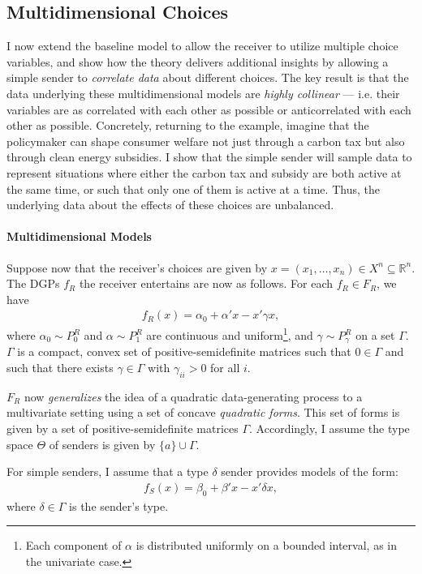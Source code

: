 \documentclass[11pt,dvipsnames]{article}
\begin{document}
\subsection{Multidimensional Choices}
I now extend the baseline model to allow the receiver to utilize multiple choice variables, and show how the theory delivers additional insights by allowing a simple sender to \emph{correlate data} about different choices.
The key result is that the data underlying these multidimensional models are \emph{highly collinear} --- i.e. their variables are as correlated with each other as possible or anticorrelated with each other as possible.
Concretely, returning to the example, imagine that the policymaker can shape consumer welfare not just through a carbon tax but also through clean energy subsidies.
I show that the simple sender will sample data to represent situations where either the carbon tax and subsidy are both active at the same time, or such that only one of them is active at a time.
Thus, the underlying data about the effects of these choices are unbalanced.
\paragraph{Multidimensional Models}
Suppose now that the receiver's choices are given by $x = (x_1,\ldots,x_n) \in X^n \subseteq \mathbb{R}^n$.
The DGPs $f_R$ the receiver entertains are now as follows.
	For each $f_R \in F_R$, we have
	\begin{align*}
	f_R(x) = \alpha_0 + \alpha' x - x'\gamma x,	
	\end{align*}
	where $\alpha_0 \sim P_0^R$ and $\alpha  \sim P_1^R$ are continuous and uniform\footnote{Each component of $\alpha$ is distributed uniformly on a bounded interval, as in the univariate case.}, and $\gamma \sim P_\gamma^R$ on a set $\Gamma$. $\Gamma$ is a compact, convex set of positive-semidefinite matrices such that $0 \in \Gamma$ and such that there exists $\gamma \in \Gamma$ with $\gamma_{ii}>0$ for all $i$.

$F_R$ now \emph{generalizes} the idea of a quadratic data-generating process to a multivariate setting using a set of concave \emph{quadratic forms}.
This set of forms is given by a set of positive-semidefinite matrices $\Gamma$.
Accordingly, I assume the type space $\Theta$ of senders is given by $\{a\} \cup \Gamma$.

For simple senders, I assume that a type $\delta$ sender provides models of the form:
\begin{align*}
f_S(x) = \beta_0+\beta'x-x'\delta x,	
\end{align*}
where $\delta \in \Gamma$ is the sender's type.
\end{document}
